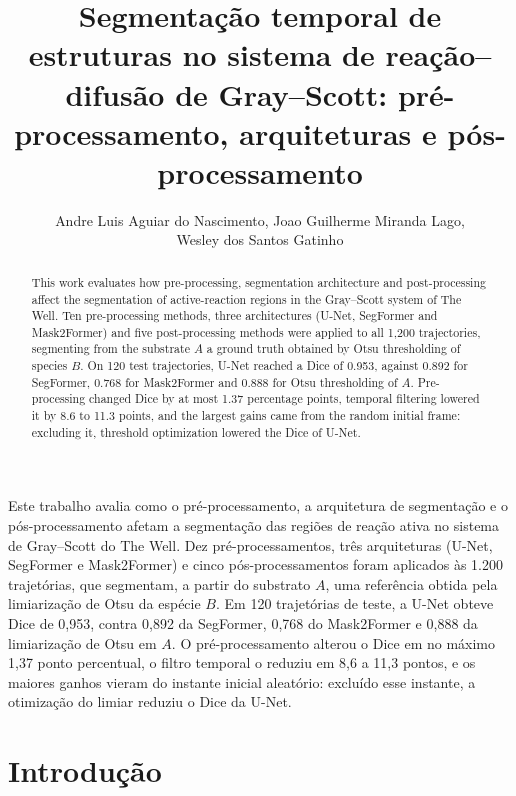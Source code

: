 \documentclass[12pt]{article}
\title{Segmentação temporal de estruturas no sistema de reação--difusão de Gray--Scott: pré-processamento, arquiteturas e pós-processamento}
\author{Andre Luis Aguiar do Nascimento\inst{1}, Joao Guilherme Miranda Lago\inst{1},\\ Wesley dos Santos Gatinho\inst{1}}
\begin{document}
\maketitle

\begin{abstract}
This work evaluates how pre-processing, segmentation architecture and post-processing affect the segmentation of active-reaction regions in the Gray--Scott system of The Well. Ten pre-processing methods, three architectures (U-Net, SegFormer and Mask2Former) and five post-processing methods were applied to all 1,200 trajectories, segmenting from the substrate $A$ a ground truth obtained by Otsu thresholding of species $B$. On 120 test trajectories, U-Net reached a Dice of 0.953, against 0.892 for SegFormer, 0.768 for Mask2Former and 0.888 for Otsu thresholding of $A$. Pre-processing changed Dice by at most 1.37 percentage points, temporal filtering lowered it by 8.6 to 11.3 points, and the largest gains came from the random initial frame: excluding it, threshold optimization lowered the Dice of U-Net.
\end{abstract}

\begin{resumo}
Este trabalho avalia como o pré-processamento, a arquitetura de segmentação e o pós-processamento afetam a segmentação das regiões de reação ativa no sistema de Gray--Scott do The Well. Dez pré-processamentos, três arquiteturas (U-Net, SegFormer e Mask2Former) e cinco pós-processamentos foram aplicados às 1.200 trajetórias, que segmentam, a partir do substrato $A$, uma referência obtida pela limiarização de Otsu da espécie $B$. Em 120 trajetórias de teste, a U-Net obteve Dice de 0,953, contra 0,892 da SegFormer, 0,768 do Mask2Former e 0,888 da limiarização de Otsu em $A$. O pré-processamento alterou o Dice em no máximo 1,37 ponto percentual, o filtro temporal o reduziu em 8,6 a 11,3 pontos, e os maiores ganhos vieram do instante inicial aleatório: excluído esse instante, a otimização do limiar reduziu o Dice da U-Net.
\end{resumo}

\section{Introdução}
\label{sec:introducao}
\end{document}
